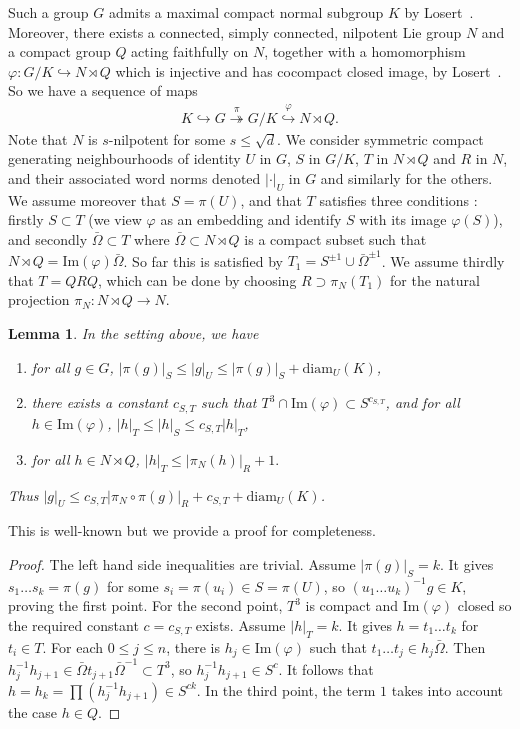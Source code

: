 \documentclass[11pt,leqno]{article}
\theoremstyle{plain}
\newtheorem{lemma}[theorem]{Lemma}
\theoremstyle{definition}
\theoremstyle{remark}
\numberwithin{equation}{section}
\begin{document}
Such a group $G$ admits a maximal compact normal subgroup $K$ by Losert~\cite[Prop. 1]{LosII}. Moreover, there exists a connected, simply connected, nilpotent Lie group $N$ and a compact group $Q$ acting faithfully on $N$, together with a homomorphism $\varphi:G/K \hookrightarrow N\rtimes Q$ which is injective and has cocompact closed image, by Losert~\cite[Thm~2]{Losert}. So we have a sequence of maps
\begin{align}\label{eq:maps}
K \hookrightarrow G \overset{\pi}{\twoheadrightarrow} G/K \overset{\varphi}{\hookrightarrow} N \rtimes Q.
\end{align}
Note that $N$ is $s$-nilpotent for some $s\le \sqrt{d}$.
We consider symmetric compact generating neighbourhoods of identity $U$ in $G$, $S$ in $G/K$,  $T$ in $N \rtimes Q$ and $R$ in $N$, and their associated word norms denoted $|\cdot|_U$ in $G$ and similarly for the others. We assume moreover that $S=\pi(U)$, and that $T$ satisfies three conditions : firstly $S \subset T$ (we view $\varphi$ as an embedding and identify $S$ with its image $\varphi(S)$), and secondly $\bar{\Omega} \subset T$ where $\bar{\Omega}\subset N\rtimes Q$ is a compact subset  such that $N\rtimes Q=\mathrm{Im}(\varphi)\bar{\Omega}$. So far this is satisfied by $T_1=S^{\pm1}\cup\bar{\Omega}^{\pm 1}$. We assume thirdly that $T=QRQ$, which can be done by choosing $R\supset \pi_N(T_1)$ for the natural projection $\pi_N: N\rtimes Q \to N$.

\begin{lemma}\label{lem:metricsG}
In the setting above, we have
\begin{enumerate}
\item for all $g \in G$, $|\pi(g)|_S \le |g|_U \le |\pi(g)|_S+\mathrm{diam}_U(K)$,
\item there exists a constant $c_{S,T}$  such that $T^3 \cap \mathrm{Im}(\varphi) \subset S^{c_{S,T}}$, and for all $h \in \mathrm{Im}(\varphi)$, $|h|_T \le |h|_S \le c_{S,T}|h|_T$, 
\item for all $h \in N \rtimes Q$, $|h|_T \le |\pi_N(h)|_R+1.$
\end{enumerate}
Thus $|g|_U \le c_{S,T}|\pi_N\circ\pi(g)|_R+c_{S,T}+\mathrm{diam}_U(K)$.
\end{lemma}

This is well-known but we provide a proof for completeness.

\begin{proof}
The left hand side inequalities are trivial. Assume $|\pi(g)|_S=k$. It gives $s_1\dots s_k=\pi(g)$ for some $s_i=\pi(u_i) \in S=\pi(U)$, so $(u_1\dots u_k)^{-1} g \in K$, proving the first point. For the second point, $T^3$ is compact and $\mathrm{Im}(\varphi)$ closed so the required constant $c=c_{S,T}$ exists. Assume $|h|_T=k$. It gives $h=t_1\dots t_k$ for $t_i\in T$. For each $0\le j \le n$, there is $h_j \in \mathrm{Im}(\varphi)$ such that $t_1\dots t_j \in h_j \bar{\Omega}$. Then $h_j^{-1}h_{j+1} \in \bar{\Omega}t_{j+1}\bar{\Omega}^{-1} \subset T^3$, so $h_j^{-1}h_{j+1} \in S^{c}$. It follows that $h=h_k=\prod(h_j^{-1}h_{j+1}) \in S^{ck}$. In the third point, the term $1$ takes into account the case $h \in Q$. 
\end{proof}
\end{document}
